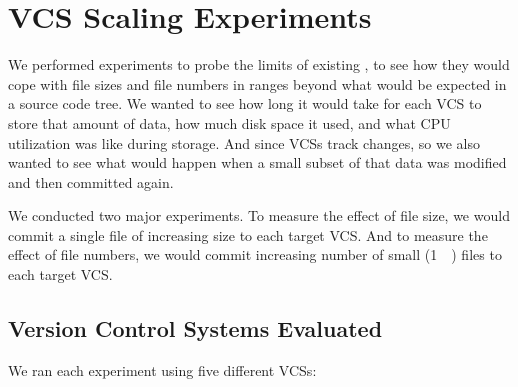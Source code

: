 \chapter{VCS Scaling Experiments}
\label{file-size-exp-desc}
\label{num-files-exp-desc}

We performed experiments to probe the limits of existing , to see
how they would cope with file sizes and file numbers in ranges beyond what would
be expected in a source code tree. We wanted to see how long it would take for
each \gls{VCS} to store that amount of data, how much disk space it used, and
what CPU utilization was like during storage. And since \glspl{VCS} track
changes, so we also wanted to see what would happen when a small subset of that
data was modified and then committed again.

We conducted two major experiments. To measure the effect of file size, we would
\gls{commit} a single file of increasing size to each target \gls{VCS}. And to
measure the effect of file numbers, we would \gls{commit} increasing number of
small (\SI{1}{\kibi\byte}) files to each target \gls{VCS}.



\section{Version Control Systems Evaluated}

We ran each experiment using five different \glspl{VCS}:

